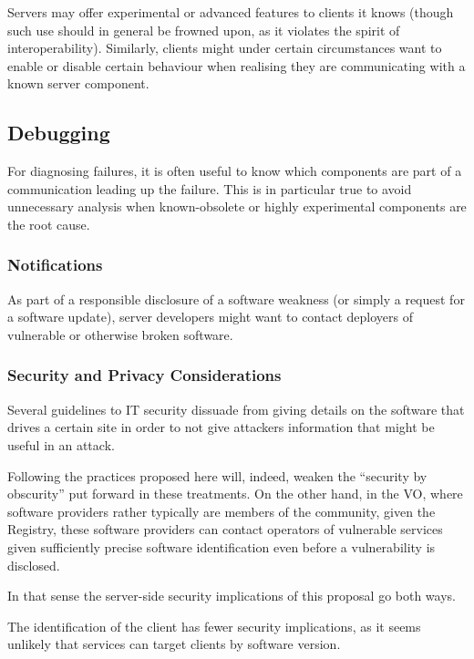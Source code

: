 \documentclass[11pt,a4paper]{ivoa}
\begin{document}
Servers may offer experimental or advanced features to clients it knows
(though such use should in general be frowned upon, as it violates the
spirit of interoperability).  Similarly, clients might under certain
circumstances want to enable or disable certain behaviour when realising
they are communicating with a known server component.

\subsection{Debugging}

For diagnosing failures, it is often useful to know which components are
part of a communication leading up the failure.  This is in particular
true to avoid unnecessary analysis when known-obsolete or highly
experimental components are the root cause.

\subsubsection{Notifications}

As part of a responsible disclosure of a software weakness (or simply a
request for a software update), server developers might want to contact
deployers of vulnerable or otherwise broken software.

\subsubsection{Security and Privacy Considerations}

Several guidelines to IT security dissuade from giving details on the
software that drives a certain site in order to not give attackers
information that might be useful in an attack.

Following the practices proposed here will, indeed, weaken the
``security by obscurity'' put forward in these treatments.  On the other
hand, in the VO, where software providers rather typically are members
of the community, given the Registry, these software providers can contact
operators of vulnerable services given sufficiently precise software
identification even before a vulnerability is disclosed.

In that sense the server-side security implications of this proposal go
both ways.

The identification of the client has fewer security implications, as it
seems unlikely that services can target clients by software version.
\end{document}
